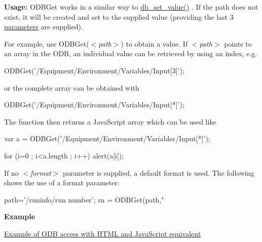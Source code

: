 {\bfseries Usage:} ODBGet works in a similar way to \hyperlink{group__odbfunctionc_gaf0b052657ba1d4f4a8b6d47dbc70008c}{db\_\-set\_\-value()} . If the path does not exist, it will be created and set to the supplied value (providing the last 3 \hyperlink{structparameters}{parameters} are supplied). \par
 For example, use ODBGet($<${\itshape path\/}$>$) to obtain a value. If $<${\itshape path\/}$>$ points to an array in the ODB, an individual value can be retrieved by using an index, e.g. 
\begin{DoxyCode}
  ODBGet('/Equipment/Environment/Variables/Input[3]');
\end{DoxyCode}
 or the complete array can be obtained with 
\begin{DoxyCode}
  ODBGet('/Equipment/Environment/Variables/Input[*]');
\end{DoxyCode}
 The function then returns a JavaScript array which can be used like 
\begin{DoxyCode}
  var a = ODBGet('/Equipment/Environment/Variables/Input[*]');

  for (i=0 ; i<a.length ; i++)
    alert(a[i]);
\end{DoxyCode}


If no $<${\itshape format\/}$>$ parameter is supplied, a default format is used. The following shows the use of a format parameter: 
\begin{DoxyCode}
path='/runinfo/run number';
rn = ODBGet(path,"%
\end{DoxyCode}


{\bfseries Example} 
\begin{DoxyItemize}
\item \hyperlink{RC_mhttpd_custom_ODB_access_examples_RC_mhttpd_js_example1}{Example of ODB access with HTML and JavaScript equivalent}
\end{DoxyItemize}

\par


\par


